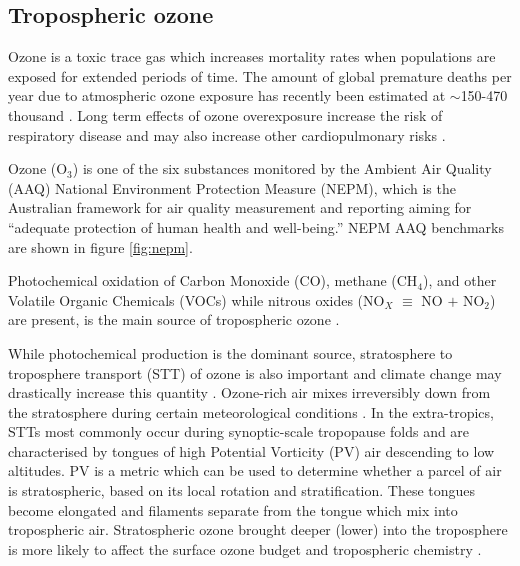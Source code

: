 \subsection{Tropospheric ozone}

Ozone is a toxic trace gas which increases mortality rates when populations are exposed for extended periods of time.
The amount of global premature deaths per year due to atmospheric ozone exposure has recently been estimated at $\sim$150-470 thousand \cite{Silva_2013, Lelieveld_2015}.
Long term effects of ozone overexposure increase the risk of respiratory disease and may also increase other cardiopulmonary risks \cite{Jerrett_2009}.

Ozone (O$_3$) is one of the six substances monitored by the Ambient Air Quality (AAQ) National Environment Protection Measure (NEPM), which is the Australian framework for air quality measurement and reporting aiming for ``adequate protection of human health and well-being.''
NEPM AAQ benchmarks are shown in figure \ref{fig:nepm}.

Photochemical oxidation of Carbon Monoxide (CO), methane (CH$_4$), and other Volatile Organic Chemicals (VOCs) while nitrous oxides (NO$_X$ $\equiv$ NO $+$ NO$_2$) are present, is the main source of tropospheric ozone \cite{Stevenson_2006}.

While photochemical production is the dominant source, stratosphere to troposphere transport (STT) of ozone is also important and climate change may drastically increase this quantity \cite{Hegglin_2009}.
Ozone-rich air mixes irreversibly down from the stratosphere during certain meteorological conditions \citep{Sprenger2003,Mihalikova2012}.
In the extra-tropics, STTs most commonly occur during synoptic-scale tropopause folds \citep{Sprenger2003} and are characterised by tongues of high Potential Vorticity (PV) air descending to low altitudes.
PV is a metric which can be used to determine whether a parcel of air is stratospheric, based on its local rotation and stratification.
These tongues become elongated and filaments separate from the tongue which mix into tropospheric air.
Stratospheric ozone brought deeper (lower) into the troposphere is more likely to affect the surface ozone budget and tropospheric chemistry \citep{Zanis2003,Langford_2009}.

